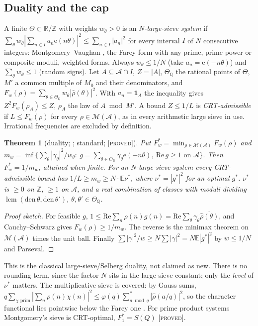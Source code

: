 \documentclass[10pt,reqno]{amsart}
\newtheorem{theorem}{Theorem}[section]
\theoremstyle{definition}
\theoremstyle{remark}
\newcommand{\A}{\mathcal A}
\newcommand{\E}{\mathbb E}
\newcommand{\Z}{\mathbb Z}
\newcommand{\ind}{\mathbf 1}
\newcommand{\lcm}{\operatorname{lcm}}
\newcommand{\e}{\mathrm e}
\newcommand{\lab}[1]{\textup{[\textsc{#1}]}}
\begin{document}
\subsection{Duality and the cap}
A finite $\Theta\subset\mathbb R/\Z$ with weights $w_\theta>0$ is an
\emph{$N$-large-sieve system} if
$\sum_\theta w_\theta|\sum_{n\in I}a_n\e(n\theta)|^2\leq\sum_{n\in I}|a_n|^2$ for every
interval $I$ of $N$ consecutive integers: Montgomery--Vaughan \cite{MV}, the
Farey form \cite{Montgomery} with any prime, prime-power or composite
moduli, weighted forms.  Always $w_\theta\leq1/N$ (take $a_n=\e(-n\theta)$) and
$\sum_\theta w_\theta\leq1$ (random signs).  Let $A\subseteq\A\cap I$, $Z=|A|$, $\Theta_{\mathbb Q}$ the
rational points of $\Theta$, $M'$ a common multiple of $M_0$ and their
denominators, and $F_w(\rho)=\sum_{\theta\in\Theta_{\mathbb Q}}w_\theta|\hat\rho(\theta)|^2$.
With $a_n=\ind_A$ the inequality gives $Z^2F_w(\rho_A)\leq Z$, $\rho_A$ the law of
$A\bmod M'$.  A bound $Z\leq1/L$ is \emph{CRT-admissible} if $L\leq F_w(\rho)$
for every $\rho\in\mathcal M(\A)$, as in every arithmetic large sieve in use.
Irrational frequencies are excluded by definition.

\begin{theorem}[duality; {\cite[Thm~2.1, Cor.~2.2]{LS}}; standard; \lab{proved}]\label{thm:LSdual}
Put $F^*_w=\min_{\rho\in\mathcal M(\A)}F_w(\rho)$ and
$m_w=\inf\{\sum_\theta|\gamma_\theta|^2/w_\theta:\ g=\sum_{\theta\in\Theta_{\mathbb Q}}\gamma_\theta\e(-n\theta),\ \mathrm{Re}\,g\geq1\text{ on }\A\}$.
Then $F^*_w=1/m_w$, attained when finite.  For an $N$-large-sieve system
every CRT-admissible bound has $1/L\geq m_w\geq N\cdot\E\nu^*$, where
$\nu^*=|g^*|^2$ for an optimal $g^*$.  $\nu^*$ is $\geq0$ on $\Z$, $\geq1$ on $\A$,
and a real combination of classes with moduli dividing
$\lcm(\mathrm{den}\,\theta,\mathrm{den}\,\theta')$, $\theta,\theta'\in\Theta_{\mathbb Q}$.
\end{theorem}
\begin{proof}[Proof sketch]
For feasible $g$,
$1\leq\mathrm{Re}\sum_n\rho(n)g(n)=\mathrm{Re}\sum_\theta\gamma_\theta\overline{\hat\rho(\theta)}$,
and Cauchy--Schwarz gives $F_w(\rho)\geq1/m_w$.  The reverse is the minimax
theorem on $\mathcal M(\A)$ times the unit ball.  Finally
$\sum|\gamma|^2/w\geq N\sum|\gamma|^2=N\E|g^*|^2$ by $w\leq1/N$ and Parseval.
\end{proof}
This is the classical large-sieve/Selberg duality, not claimed as new.
There is no rounding term, since the factor $N$ sits in the large-sieve
constant; only the \emph{level} of $\nu^*$ matters.  The multiplicative
sieve is covered: by Gauss sums,
$q\sum_{\chi\text{ prim}}|\sum_n\rho(n)\chi(n)|^2\leq\varphi(q)\sum^*_{a\bmod q}|\hat\rho(a/q)|^2$,
so the character functional lies pointwise below the Farey one
\cite[Rem.~2.5]{LS}.  For prime product systems Montgomery's sieve is
CRT-optimal, $F^*_1=S(Q)$ \cite[Prop.~2.6]{LS} \lab{proved}.
\end{document}
